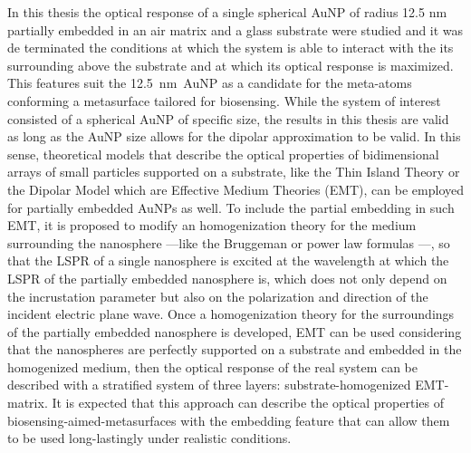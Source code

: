 
In this thesis the optical response of a single spherical AuNP of radius 12.5 nm partially embedded in an air matrix and a glass substrate were studied and it was de terminated the conditions at which the system is  able to interact with the its surrounding above the substrate and  at which its optical response is maximized. This features suit the 12.5~nm~AuNP as a candidate for the meta-atoms conforming a metasurface tailored for biosensing.  While the system of interest consisted of a spherical AuNP of specific size, the results in this thesis are valid as long as the AuNP size allows for the dipolar approximation to be valid. In this sense, theoretical models that describe the optical properties of bidimensional arrays of small particles supported on a substrate, like the Thin Island Theory \cite{bedeaux_optical_2004} or the Dipolar Model \cite{barrera1991optical} which are Effective Medium Theories (EMT), can be employed for partially embedded AuNPs as well. To include the partial embedding in such EMT, it is proposed to modify an homogenization theory for the medium surrounding the nanosphere ---like the Bruggeman or power law formulas \cite{sihvola_electromagnetic_2008}---, so that the LSPR of a single nanosphere is excited at the wavelength at which the LSPR of the partially embedded nanosphere is, which does not only depend on the incrustation parameter but also on the polarization and direction of the incident electric plane wave. Once a homogenization theory for the surroundings of the partially embedded nanosphere is developed, EMT can be used considering that the nanospheres are perfectly supported on a substrate and embedded in the homogenized medium, then the optical response of the real system can be described with a stratified system of three layers: substrate-homogenized EMT-matrix. It is expected that this approach can describe the optical properties of biosensing-aimed-metasurfaces with the embedding feature that can allow them to be used long-lastingly under realistic conditions.
